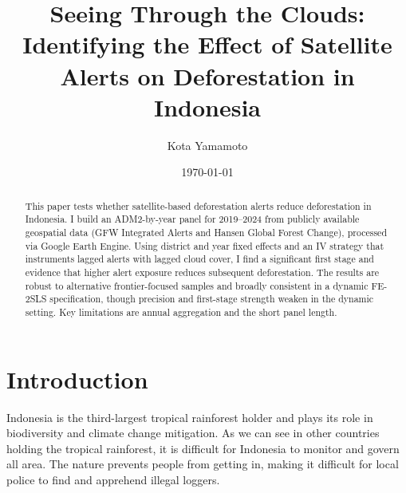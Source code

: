 \documentclass[hidelinks,12pt]{article}
\begin{document}
\begin{titlepage}
\title{Seeing Through the Clouds: Identifying the Effect of Satellite Alerts on Deforestation in Indonesia}
\author{Kota Yamamoto}
\date{\today}

\maketitle

\vspace{-0.5cm}

\begin{abstract}
\noindent 


This paper tests whether satellite-based deforestation alerts reduce deforestation in Indonesia. I build an ADM2-by-year panel for 2019–2024 from publicly available geospatial data (GFW Integrated Alerts and Hansen Global Forest Change), processed via Google Earth Engine. Using district and year fixed effects and an IV strategy that instruments lagged alerts with lagged cloud cover, I find a significant first stage and evidence that higher alert exposure reduces subsequent deforestation. The results are robust to alternative frontier-focused samples and broadly consistent in a dynamic FE-2SLS specification, though precision and first-stage strength weaken in the dynamic setting. Key limitations are annual aggregation and the short panel length.




\end{abstract}
\setcounter{page}{0}
\thispagestyle{empty}

\end{titlepage}
\pagebreak \newpage

\doublespacing

\tableofcontents
\clearpage

\newpage

\section{Introduction} \label{sec:introduction}


Indonesia is the third-largest tropical rainforest holder and plays its role in biodiversity and climate change mitigation. As we can see in other countries holding the tropical rainforest, it is difficult for Indonesia to monitor and govern all area. The nature prevents people from getting in, making it difficult for local police to find and apprehend illegal loggers.
\end{document}
